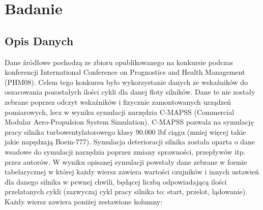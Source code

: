 \newpage
\section{Badanie}
\subsection{Opis Danych} \label{opis_danych}
Dane źródłowe pochodzą ze zbioru opublikowanego na konkursie podczas konferencji International Conference on Prognostics and Health Management (PHM08). Celem tego konkursu było wykorzystanie danych ze wskaźników do oszacowania pozostałych ilości cykli dla danej floty silników.  Dane te nie zostały zebrane poprzez odczyt wskaźników i fizycznie zamontowanych urządzeń pomiarowych, lecz w wyniku symulacji narzędzia C-MAPSS (Commercial Modular Aero-Propulsion System Simulation). C-MAPSS pozwala na symulację pracy silnika turbowentylatorowego klasy 90.000 lbf ciągu (mniej więcej takie jakie napędzają Boein-777). Symulacja deterioracji silnika została oparta o dane wsadowe do symulacji narzędzia poprzez zmiany sprawności, przepływów itp. przez autorów.
W wyniku opisanej symulacji powstały dane zebrane w formie tabelarycznej w której każdy wiersz zawiera wartości czujników i innych ustawień dla danego silnika w pewnej chwili, będącej liczbą odpowiadającą ilości przelatanych cykli (zazwyczaj cykl pracy silnika to: start, przelot, lądowanie).
Każdy wiersz zawiera poniżej zestawione kolumny:

